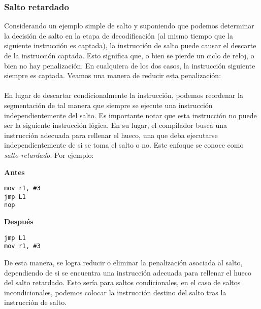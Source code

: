 \subsubsection{Salto retardado}
Considerando un ejemplo simple de salto y suponiendo que podemos determinar la decisión de salto en la etapa
de decodificación (al mismo tiempo que la siguiente instrucción es captada), la instrucción de salto puede 
causar el descarte de la instrucción captada. Esto significa que, o bien se pierde un ciclo de reloj, o bien no hay penalización.
En cualquiera de los dos casos, la instrucción siguiente siempre es captada. Veamos una manera de reducir esta penalización:
\\ \\
En lugar de descartar condicionalmente la instrucción, podemos reordenar la segmentación de tal manera que siempre se ejecute 
una instrucción independientemente del salto. Es importante notar que esta instrucción no puede ser la 
siguiente instrucción lógica. En su lugar, el compilador busca una instrucción adecuada para rellenar el hueco,
una que deba ejecutarse independientemente de si se toma el salto o no. 
Este enfoque se conoce como \textit{salto retardado}. Por ejemplo:

\begin{center}
    \begin{minipage}{0.35\textwidth}
        \textbf{Antes}
        \begin{verbatim}
mov r1, #3
jmp L1
nop
        \end{verbatim}
    \end{minipage}
    \begin{minipage}{0.35\textwidth}
        \textbf{Después}
        \begin{verbatim}
jmp L1
mov r1, #3
        \end{verbatim}
    \end{minipage}
\end{center}

De esta manera, se logra reducir o eliminar la penalización asociada al salto, dependiendo de
si se encuentra una instrucción adecuada para rellenar el hueco del salto retardado. Esto sería para saltos condicionales, en el caso de 
saltos incondicionales, podemos colocar la instrucción destino del salto tras la instrucción de salto.
